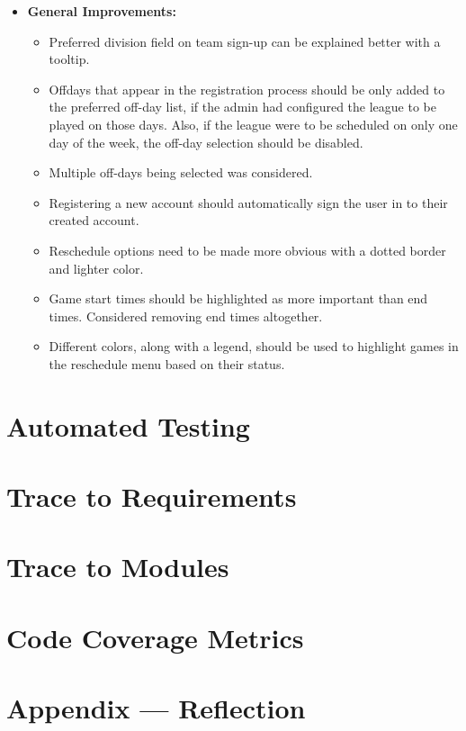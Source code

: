 \documentclass[12pt, titlepage]{article}
\begin{document}
\begin{itemize}
  \item \textbf{General Improvements:}
  \begin{itemize}
    \item Preferred division field on team sign-up can be explained better with a tooltip.
    \item Offdays that appear in the registration process should be only added to the preferred off-day
    list, if the admin had configured the league to be played on those days. Also, if the league were
    to be scheduled on only one day of the week, the off-day selection should be disabled.
    \item Multiple off-days being selected was considered.
    \item Registering a new account should automatically sign the user in to their created account.
    \item Reschedule options need to be made more obvious with a dotted border and lighter color.
    \item Game start times should be highlighted as more important than end times. Considered removing
    end times altogether.
    \item Different colors, along with a legend, should be used to highlight games in the reschedule
    menu based on their status.
  \end{itemize}
\end{itemize}

\section{Automated Testing}
		
\section{Trace to Requirements}
		
\section{Trace to Modules}		

\section{Code Coverage Metrics}




\newpage{}
\section*{Appendix --- Reflection}
\end{document}
